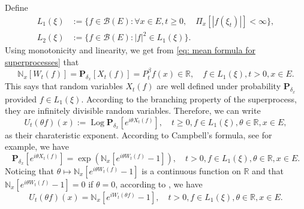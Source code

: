 \documentclass[12pt]{amsart}
\theoremstyle{plain}
\theoremstyle{definition}
\numberwithin{equation}{section}
\begin{document}
    Define
\begin{align}
    L_1(\xi)
    &:= \{f\in \mathcal B(E): \forall x\in E, t\geq 0, \quad \Pi_x[|f(\xi_t)|]< \infty\},
    \\L_2(\xi)
    &:= \{f \in \mathcal B(E): |f|^2 \in L_1(\xi)\}.
\end{align}
    Using monotonicity and linearity, we get from \eqref{eq: mean formula for superprocesses}  that
\begin{equation}
    \mathbb N_x[W_t(f)]
    =\mathbf P_{\delta_x}[X_t(f)]=P^\beta_t f(x) \in \mathbb R,
    \quad f\in L_1(\xi), t > 0,x\in E.
\end{equation}
    This says that random variables $X_t(f)$ are well defined under probability $\mathbf P_{\delta_x}$ provided $f\in L_1(\xi)$.
    According to the branching property of the superprocess, they are infinitely divisible random variables.
    Therefore, we can write 
\[
    U_t(\theta f)(x) := \operatorname{Log} \mathbf P_{\delta_x}[e^{i \theta X_t(f)}],
    \quad t\geq 0, f\in L_1(\xi), \theta \in \mathbb R, x\in E,
\] 
    as their charateristic exponent.
    According to Campbell's formula, see \cite[Theorem 2.7]{Kyprianou2014Fluctuations} for example, we have
\[   
    \mathbf P_{\delta_x} [e^{i\theta X_t(f)}]
    = \exp(\mathbb N_x[ e^{i\theta W_t(f)} - 1]),
    \quad t>0, f\in L_1(\xi), \theta \in \mathbb R, x\in E.
\]
    Noticing that $\theta \mapsto \mathbb N_x[e^{i\theta W_t(f)} - 1]$ is a continuous function on $\mathbb R$ and that $\mathbb N_x[e^{i\theta W_t(f)} - 1] = 0$ if $\theta = 0$, according to \cite[Lemma 7.6]{Sato1999Levy}, we have
\begin{equation}
\label{eq: N and characteristic exponent}
    U_t(\theta f)(x) = \mathbb N_x[e^{i W_t(\theta f)} - 1],
    \quad t>0, f\in L_1(\xi), \theta \in \mathbb R, x\in E.
\end{equation}
\end{document}
